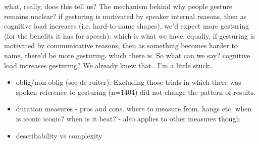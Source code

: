 \documentclass[a4paper,man,natbib]{apa6}
\newcommand\blankpage{%
    \null
    \thispagestyle{empty}%
    \addtocounter{page}{-1}%
    \newpage}
\begin{document}
what, really, does this tell us?
The mechanism behind why people gesture remains unclear?
if gesturing is motivated by speaker internal reasons, then as cognitive load increases (i.e. hard-to-name shapes), we'd expect more gesturing (for the benefits it has for speech). 
which is what we have.
equally, if gesturing is motivated by communicative reasons, then as something becomes harder to name, there'd be more gesturing.
which there is.
So what can we say? cognitive load increases gesturing? We already knew that..
I'm a little stuck..






\begin{itemize}
\item oblig/non-oblig (see de ruiter): Excluding those trials in which there was spoken reference to gesturing (n=1404) did not change the pattern of results. 
\item duration measures - pros and cons. where to measure from. hangs etc. when is iconic iconic? when is it beat? - also applies to other measures though
\item describability vs complexity
\end{itemize}


\afterpage{\blankpage}


\end{document}
